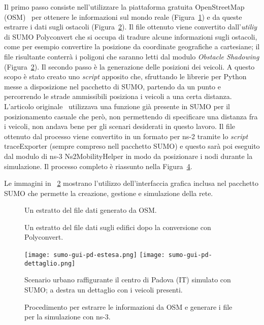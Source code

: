 Il primo passo consiste nell'utilizzare la piattaforma gratuita OpenStreetMap (OSM)~\cite{osmWebsite} per
ottenere le informazioni sul mondo reale (Figura~\ref{fig:esempio-file-osm}) e da queste estrarre i dati sugli ostacoli (Figura~\ref{fig:esempio-file-poly}).
Il file ottenuto viene convertito dall'\textit{utiliy} di SUMO Polyconvert che si occupa di tradure alcune informazioni
sugli ostacoli, come per esempio convertire la posizione da coordinate geografiche a cartesiane;
il file risultante conterrà i poligoni che saranno letti dal modulo \textit{Obstacle Shadowing} (Figura~\ref{fig:esempio-file-poly}).
Il secondo passo è la generazione delle posizioni dei veicoli.
A questo scopo è stato creato uno \textit{script} apposito che, sfruttando le librerie per Python messe a disposizione
nel pacchetto di SUMO, partendo da un punto e percorrendo le strade ammissibili posiziona i veicoli a una certa distanza.
L'articolo originale~\cite{Carpenter:2015:OMI:2756509.2756512} utilizzava una funzione già presente in SUMO
per il posizionamento casuale che però, non permettendo di specificare una distanza fra i veicoli, non andava bene per gli scenari desiderati in questo lavoro.
%
Il file ottenuto dal processo viene convertito in un formato per ns-2 tramite lo \textit{script} traceExporter (sempre compreso nell pacchetto SUMO)
e questo sarà poi eseguito dal modulo di ns-3 \textsf{Ns2MobilityHelper} in modo da posizionare i nodi durante la simulazione.
Il processo completo è riassunto nella Figura~\ref{fig:generazione-file-sumo}.

Le immagini in \figurename~\ref{fig:esempio-file-poly} mostrano l'utilizzo dell'interfaccia grafica
inclusa nel pacchetto SUMO che permette la creazione, gestione e simulazione della rete.
%
\begin{figure}[htbp]
	\centering
\caption{Un estratto del file dati generato da OSM.\label{fig:esempio-file-osm}}
\end{figure}
%
%
\begin{figure}[htbp]
	\centering
\caption{Un estratto del file dati sugli edifici dopo la conversione con Polyconvert.\label{fig:esempio-file-poly}}
\end{figure}
%
\begin{figure}[htbp]
	\centering
		\texttt{[image: sumo-gui-pd-estesa.png]}
		\hfill
		\texttt{[image: sumo-gui-pd-dettaglio.png]}
\caption{Scenario urbano raffigurante il centro di Padova (IT) simulato con SUMO; a destra un dettaglio con i veicoli presenti.\label{fig:sumo-gui}}
\end{figure}
%
\begin{figure}[htbp]
	\centering
	{
		\setlength{\fboxsep}{0pt}	%
	}
\caption{Procedimento per estrarre le informazioni da OSM e generare i file per la simulazione con ns-3.\label{fig:generazione-file-sumo}}
\end{figure}
